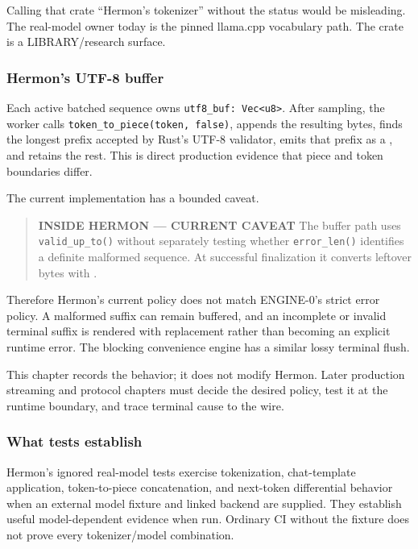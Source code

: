 \documentclass[
  10pt,
]{article}
\begin{document}
Calling that crate ``Hermon's tokenizer'' without the status would be
misleading. The real-model owner today is the pinned llama.cpp
vocabulary path. The crate is a LIBRARY/research surface.

\subsubsection{Hermon's UTF-8 buffer}\label{hermons-utf-8-buffer}

Each active batched sequence owns
\texttt{utf8\_buf:\ Vec\textless{}u8\textgreater{}}. After sampling, the
worker calls \texttt{token\_to\_piece(token,\ false)}, appends the
resulting bytes, finds the longest prefix accepted by Rust's UTF-8
validator, emits that prefix as a
\texttt{}, and retains the rest.
This is direct production evidence that piece and token boundaries
differ.

The current implementation has a bounded caveat.

\begin{quote}
\textbf{INSIDE HERMON --- CURRENT CAVEAT} The buffer path uses
\texttt{valid\_up\_to()} without separately testing whether
\texttt{error\_len()} identifies a definite malformed sequence. At
successful finalization it converts leftover bytes with
\texttt{}.
\end{quote}

Therefore Hermon's current policy does not match ENGINE-0's strict error
policy. A malformed suffix can remain buffered, and an incomplete or
invalid terminal suffix is rendered with replacement rather than
becoming an explicit runtime error. The blocking convenience engine has
a similar lossy terminal flush.

This chapter records the behavior; it does not modify Hermon. Later
production streaming and protocol chapters must decide the desired
policy, test it at the runtime boundary, and trace terminal cause to the
wire.

\subsubsection{What tests establish}\label{what-tests-establish}

Hermon's ignored real-model tests exercise tokenization, chat-template
application, token-to-piece concatenation, and next-token differential
behavior when an external model fixture and linked backend are supplied.
They establish useful model-dependent evidence when run. Ordinary CI
without the fixture does not prove every tokenizer/model combination.
\end{document}
